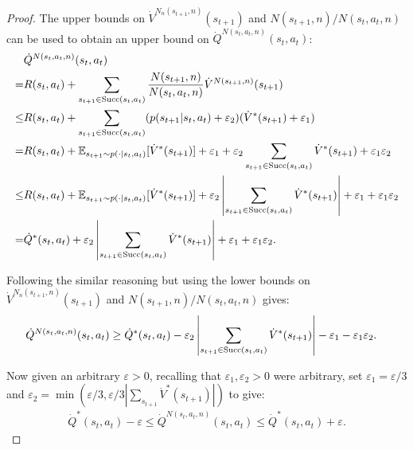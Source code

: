 \begin{proof}
        The upper bounds on $\dot{V}^{N_n(s_{t+1},n)}(s_{t+1})$ and $N(s_{t+1},n)/N(s_t,a_t,n)$ can be used to obtain an upper bound on $\dot{Q}^{N(s_t,a_t,n)}(s_t,a_t)$: 
        \begin{align}
            &\dot{Q}^{N(s_t,a_t,n)}(s_t,a_t) \\
                =& R(s_t,a_t) 
                    + \sum_{s_{t+1}\in{\textnormal{Succ}(s_t,a_t)}}\frac{N(s_{t+1},n)}{N(s_t,a_t,n)} 
                        \dot{V}^{N(s_{t+1},n)}(s_{t+1}) \\
                \leq& R(s_t,a_t) 
                    + \sum_{s_{t+1}\in{\textnormal{Succ}(s_t,a_t)}}(p(s_{t+1}|s_t,a_t)+\varepsilon_2)
                        (\dot{V}^*(s_{t+1})+\varepsilon_1) \\
                =& R(s_t,a_t) 
                    + \mathbb{E}_{s_{t+1}\sim p(\cdot|s_t,a_t)}[\dot{V}^*(s_{t+1})] 
                    + \varepsilon_1 
                    + \varepsilon_2\sum_{s_{t+1}\in{\textnormal{Succ}(s_t,a_t)}} \dot{V}^*(s_{t+1}) 
                    + \varepsilon_1 \varepsilon_2 \\
                \leq& R(s_t,a_t) 
                    + \mathbb{E}_{s_{t+1}\sim p(\cdot|s_t,a_t)}[\dot{V}^*(s_{t+1})] 
                    + \varepsilon_2\left|\sum_{s_{t+1}\in{\textnormal{Succ}(s_t,a_t)}} \dot{V}^*(s_{t+1})\right| 
                    + \varepsilon_1 + \varepsilon_1 \varepsilon_2 \\
                =& \dot{Q}^*(s_t,a_t) 
                    + \varepsilon_2\left|\sum_{s_{t+1}\in{\textnormal{Succ}(s_t,a_t)}} \dot{V}^*(s_{t+1})\right| 
                    + \varepsilon_1 
                    + \varepsilon_1 \varepsilon_2.
        \end{align}
        
        Following the similar reasoning but using the lower bounds on $\dot{V}^{N_n(s_{t+1},n)}(s_{t+1})$ and $N(s_{t+1},n)/N(s_t,a_t,n)$ gives: 
        \begin{align}
            \dot{Q}^{N(s_t,a_t,n)}(s_t,a_t) 
                &\geq \dot{Q}^*(s_t,a_t) 
                    - \varepsilon_2\left|\sum_{s_{t+1}\in{\textnormal{Succ}(s_t,a_t)}} \dot{V}^*(s_{t+1})\right| 
                    - \varepsilon_1 
                    - \varepsilon_1 \varepsilon_2.
        \end{align}
        
        Now given an arbitrary $\varepsilon >0$, recalling that $\varepsilon_1,\varepsilon_2>0$ were arbitrary, set $\varepsilon_1 = \varepsilon/3$ and $\varepsilon_2 = \min(\varepsilon/3, \varepsilon/3|\sum_{s_{t+1}} \dot{V}^*(s_{t+1})|)$ to give:
        \begin{align}
            \dot{Q}^*(s_t,a_t) - \varepsilon \leq \dot{Q}^{N(s_t,a_t,n)}(s_t,a_t) \leq \dot{Q}^*(s_t,a_t) + \varepsilon.
        \end{align}
        

\end{proof}
